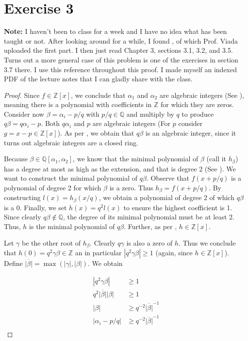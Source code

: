 \documentclass{article}
\newcommand{\Q}{\mathbb{Q}}
\newcommand{\Z}{\mathbb{Z}}
\newcommand{\abs}[1]{\left| #1 \right|}
\begin{document}
\section*{Exercise 3}
\textbf{Note:} I haven't been to class for a week and I have no idea what has been taught or not. After looking around for a while, I found \cite{Everste1}, of which Prof. Viada uploaded the first part. I then just read Chapter 3, sections 3.1, 3.2, and 3.5. Turns out a more general case of this problem is one of the exercises in section 3.7 there. I use this reference throughout this proof. I made myself an indexed PDF of the lecture notes that I can gladly share with the class.


\begin{proof}
Since $f \in \Z[x]$, we conclude that $\alpha_1$ and $\alpha_2$ are algebraic integers (See \cite[41]{Everste1}), meaning there is a polynomial with coefficients in $\Z$ for which they are zeros. Consider now $\beta = \alpha_i - p/q$ with $p/q \in \Q$ and multiply by $q$ to produce $q\beta = q\alpha_i - p$.  Both $q\alpha_i$ and $p$ are algebraic integers (For $p$ consider $g = x - p \in \Z[x]$). As per \cite[\nopp Lemma 3.3]{Everste1}, we obtain that $q\beta$ is an algebraic integer, since it turns out algebraic integers are a closed ring. 

Because $\beta \in \Q[\alpha_1, \alpha_2]$, we know that the minimal polynomial of $\beta$ (call it $h_{\beta}$) has a degree at most as high as the extension, and that is degree 2 (See \cite[\nopp Corollary 3.23]{Everste1}). We want to construct the minimal polynomial of $q\beta$. Observe that $f(x + p/q)$ is a polynomial of degree 2 for which $\beta$ is a zero. Thus $h_{\beta} = f(x + p/q)$. By constructing $l(x) = h_{\beta}(x/q)$, we obtain a polynomial of degree 2 of which $q\beta$ is a 0. Finally, we set $h(x) = q^2l(x)$ to ensure the highest coefficient is 1.  Since clearly $q\beta \notin \Q$, the degree of its minimal polynomial must be at least 2. Thus, $h$ is the minimal polynomial of $q\beta$. Further, as per \cite[\nopp Lemma 3.4]{Everste1}, $h \in \Z[x]$. 

Let $\gamma$ be the other root of $h_{\beta}$. Clearly $q\gamma$ is also a zero of $h$. Thus we conclude that $h(0) = q^2 \gamma \beta \in \Z$ an in particular $\abs{q^2 \gamma \beta} \geq 1$ (again, since $h \in \Z[x]$). Define $\overline{|\beta|} = \max(\abs{\gamma}, \abs{\beta})$. We obtain

\begin{align*}
  \abs{q^2 \gamma \beta} &\geq 1 \\
  q^2 \overline{|\beta|} \abs{\beta} &\geq 1 \\
  \abs{\beta} &\geq q^{-2} \overline{|\beta|}^{-1} \\
  \abs{\alpha_i - p/q} &\geq q^{-2} \overline{|\beta|}^{-1} \\
\end{align*}


\end{proof}
\end{document}
